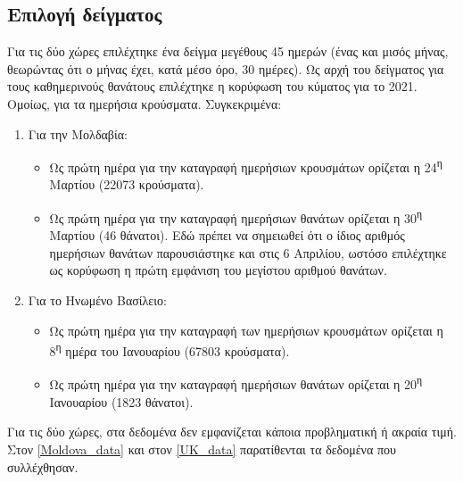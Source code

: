 \documentclass{article}
\begin{document}
    \subsection{Επιλογή δείγματος}
     \label{sec:sample}
        Για τις δύο χώρες επιλέχτηκε ένα δείγμα μεγέθους 45 ημερών (ένας και μισός μήνας, θεωρώντας ότι ο μήνας έχει, κατά μέσο όρο, 30 ημέρες). Ως αρχή του δείγματος για τους καθημερινούς θανάτους επιλέχτηκε η κορύφωση του κύματος για το 2021. Ομοίως, για τα ημερήσια κρούσματα. Συγκεκριμένα:
        \begin{enumerate}
        \item Για την Μολδαβία:
            \begin{itemize}
                \item Ως πρώτη ημέρα για την καταγραφή ημερήσιων κρουσμάτων ορίζεται η 24\textsuperscript{η} Μαρτίου (22073 κρούσματα). 
                \item Ως πρώτη ημέρα για την καταγραφή ημερήσιων θανάτων ορίζεται η 30\textsuperscript{η} Μαρτίου (46 θάνατοι). Εδώ πρέπει να σημειωθεί ότι ο ίδιος αριθμός ημερήσιων θανάτων παρουσιάστηκε και στις 6 Απριλίου, ωστόσο επιλέχτηκε ως κορύφωση η πρώτη εμφάνιση του μεγίστου αριθμού θανάτων.
            \end{itemize}
        \item Για το Ηνωμένο Βασίλειο:
            \begin{itemize}
                \item Ως πρώτη ημέρα για την καταγραφή των ημερήσιων κρουσμάτων ορίζεται η 8\textsuperscript{η} ημέρα του Ιανουαρίου (67803 κρούσματα). 
                \item Ως πρώτη ημέρα για την καταγραφή ημερήσιων θανάτων ορίζεται η 20\textsuperscript{η} Ιανουαρίου (1823 θάνατοι).
            \end{itemize}
        \end{enumerate}
        
        Για τις δύο χώρες, στα δεδομένα δεν εμφανίζεται κάποια προβληματική ή ακραία τιμή. Στον \autoref{Moldova_data} και στον \autoref{UK_data} παρατίθενται τα δεδομένα που συλλέχθησαν.
                
\end{document}
